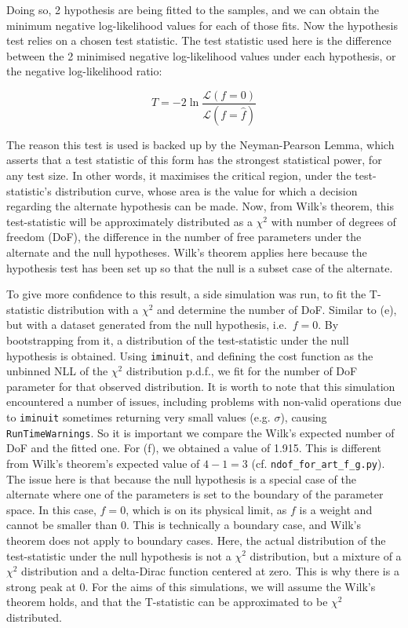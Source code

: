 \documentclass[12pt]{report} %
\begin{document}
Doing so, 2 hypothesis are being fitted to the samples, and we can obtain the minimum negative log-likelihood values for each of those fits\cite{iminuitmethod}. Now the hypothesis test relies on a chosen test statistic. The test statistic used here is the difference between the 2 minimised negative log-likelihood values under each hypothesis, or the negative log-likelihood ratio:

\begin{equation}
    T = -2 \ln{\frac{\mathcal{L}(f = 0)}{\mathcal{L}(f = \hat{f})}}
\end{equation}

The reason this test is used is backed up by the Neyman-Pearson Lemma, which asserts that a test statistic of this form has the strongest statistical power, for any test size. In other words, it maximises the critical region, under the test-statistic's distribution curve, whose area is the value for which a decision regarding the alternate hypothesis can be made\cite[p. 170]{Wass}. Now, from Wilk's theorem, this test-statistic will be approximately distributed as a $\chi^{2}$ with number of degrees of freedom (DoF), the difference in the number of free parameters under the alternate and the null hypotheses\cite{Wilkls1938}. Wilk's theorem applies here because the hypothesis test has been set up so that the null is a subset case of the alternate\cite{huelsenbeck1997phylogeny}.  

To give more confidence to this result, a side simulation was run, to fit the T-statistic distribution with a $\chi^{2}$ and determine the number of DoF. Similar to (e), but with a dataset generated from the null hypothesis, i.e.\ $f=0$. By bootstrapping from it, a distribution of the test-statistic under the null hypothesis is obtained. Using \texttt{iminuit}, and defining the cost function as the unbinned NLL of the $\chi^{2}$ distribution p.d.f., we fit for the number of DoF parameter for that observed distribution\cite{iminuitmethod}. It is worth to note that this simulation encountered a number of issues, including problems with non-valid operations due to \texttt{iminuit} sometimes returning very small values (e.g. $\sigma$), causing \texttt{RunTimeWarnings}. So it is important we compare the Wilk's expected number of DoF and the fitted one. For (f), we obtained a value of 1.915. This is different from Wilk's theorem's expected value of $4 - 1 = 3$ (cf. \texttt{ndof\_for\_art\_f\_g.py}). The issue here is that because the null hypothesis is a special case of the alternate where one of the parameters is set to the boundary of the parameter space. In this case, $f=0$, which is on its physical limit, as $f$ is a weight and cannot be smaller than 0. This is technically a boundary case, and Wilk's theorem does not apply to boundary cases\cite{1911.10237}. Here, the actual distribution of the test-statistic under the null hypothesis is not a $\chi^{2}$ distribution, but a mixture of a $\chi^{2}$ distribution and a delta-Dirac function centered at zero\cite{1911.10237}. This is why there is a strong peak at 0. For the aims of this simulations, we will assume the Wilk's theorem holds, and that the T-statistic can be approximated to be $\chi^{2}$ distributed.
\end{document}
